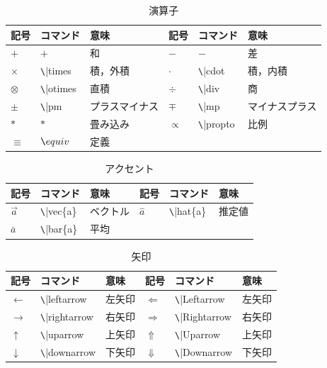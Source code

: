 \documentclass[11pt,a4paper]{jsarticle}
\begin{document}
\begin{table} [ h ]
\caption{演算子}
	\begin{center}
	\begin{tabular}{| l | l | l || l | l | l |} \hline
		記号 & コマンド & 意味 & 記号 & コマンド & 意味 \\ \hline
		$+$ & $+$ & 和 & $-$ & $-$ & 差 \\ \hline
		$\times$ & \verb|\|times & 積，外積 & $\cdot$ & \verb|\|cdot & 積，内積 \\ \hline
		$\otimes$ & \verb|\|otimes & 直積　& $\div$ & \verb|\|div & 商 \\ \hline
		$\pm$ & \verb|\|pm & プラスマイナス & $\mp$ & \verb|\|mp & マイナスプラス \\ \hline
		$*$ & $*$ & 畳み込み & $\propto$ & \verb|\|propto & 比例 \\ \hline
		$\equiv$ & $\verb|\|equiv$ & 定義 & & &  \\ \hline
	\end{tabular}
	\end{center}
\end{table}

\begin{table} [ h ]
\caption{アクセント}
	\begin{center}
	\begin{tabular}{| l | l | l || l | l | l |} \hline
		記号 & コマンド & 意味 & 記号 & コマンド & 意味 \\ \hline
		$\vec{a}$ & \verb|\|vec\{a\} & ベクトル & $\hat{a}$ & \verb|\|hat\{a\} & 推定値 \\ \hline
		$\bar{a}$ & \verb|\|bar\{a\} & 平均 &  &  &  \\ \hline
	\end{tabular}
	\end{center}
\end{table}

\begin{table} [ h ]
\caption{矢印}
	\begin{center}
	\begin{tabular}{| l | l | l || l | l | l |} \hline
		記号 & コマンド & 意味 & 記号 & コマンド & 意味 \\ \hline
		$\leftarrow$ & \verb|\|leftarrow & 左矢印 & $\Leftarrow$ & \verb|\|Leftarrow & 左矢印 \\ \hline
		$\rightarrow$ & \verb|\|rightarrow & 右矢印 & $\Rightarrow$ & \verb|\|Rightarrow & 右矢印 \\ \hline
		$\uparrow$ & \verb|\|uparrow & 上矢印 & $\Uparrow$ & \verb|\|Uparrow & 上矢印 \\ \hline
		$\downarrow$ & \verb|\|downarrow & 下矢印 & $\Downarrow$ & \verb|\|Downarrow & 下矢印 \\ \hline
	\end{tabular}
	\end{center}
\end{table}
\end{document}
